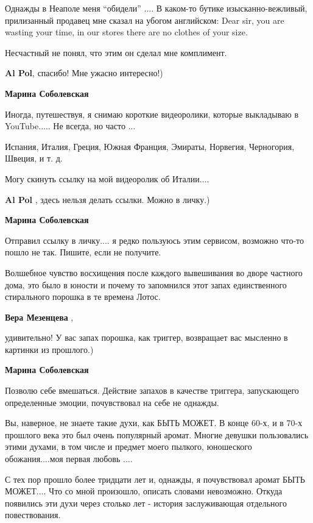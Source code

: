\begin{itemize}
\begin{itemize}
\begin{itemize}
Однажды в Неаполе меня \enquote{обидели} .... В каком-то бутике изысканно-вежливый,
прилизанный продавец мне сказал на убогом английском: Dear sir, you are
wasting your time, in our stores there are no clothes of your size.

Несчастный не понял, что этим он сделал мне комплимент.

\textbf{Al Pol}, спасибо! Мне ужасно интересно!)

\textbf{Марина Соболевская} 

Иногда, путешествуя, я снимаю короткие видеоролики, которые выкладываю в
YouTube..... Не всегда, но часто ...

Испания, Италия, Греция, Южная Франция, Эмираты, Норвегия, Черногория, Швеция, и т. д.

Могу скинуть ссылку на мой видеоролик об Италии....

\textbf{Al Pol} , здесь нельзя делать ссылки. Можно в личку.)

\textbf{Марина Соболевская} 

Отправил ссылку в личку.... я редко пользуюсь этим сервисом, возможно что-то
пошло не так. Пишите, если не получите.

\end{itemize} %


Волшебное чувство восхищения после каждого вывешивания во дворе частного
дома, это было в юности и почему то запомнился этот запах единственного
стирального порошка в те времена Лотос.

\begin{itemize} %
\textbf{Вера Мезенцева} , 

удивительно! У вас запах порошка, как триггер, возвращает вас мысленно в картинки из прошлого.)

\textbf{Марина Соболевская} 

Позволю себе вмешаться. Действие запахов в качестве триггера, запускающего
определенные эмоции, почувствовал на себе не однажды.

Вы, наверное, не знаете такие духи, как БЫТЬ МОЖЕТ. В конце 60-х, и в 70-х
прошлого века это был очень популярный аромат. Многие девушки пользовались
этими духами, в том числе и предмет моего пылкого, юношеского обожания....моя
первая любовь ....

С тех пор прошло более тридцати лет и, однажды, я почувствовал аромат БЫТЬ
МОЖЕТ.... Что со мной произошло, описать словами невозможно. Откуда появились
эти духи через столько лет - история заслуживающая отдельного повествования.


\end{itemize}
\end{itemize}
\end{itemize}
